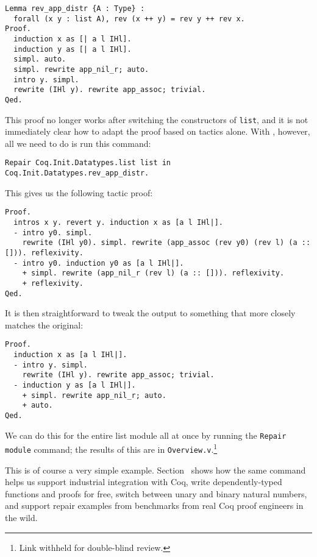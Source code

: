 \begin{lstlisting}
Lemma rev_app_distr {A : Type} :
  forall (x y : list A), rev (x ++ y) = rev y ++ rev x.
Proof.
  induction x as [| a l IHl].
  induction y as [| a l IHl].
  simpl. auto.
  simpl. rewrite app_nil_r; auto.
  intro y. simpl.
  rewrite (IHl y). rewrite app_assoc; trivial.
Qed.
\end{lstlisting}
This proof no longer works after switching the constructors of \lstinline{list},
and it is not immediately clear how to adapt the proof based on tactics alone.
With \toolname, however, all we need to do is run this command: %

\begin{lstlisting}
Repair Coq.Init.Datatypes.list list in Coq.Init.Datatypes.rev_app_distr.
\end{lstlisting}
This gives us the following tactic proof:

\begin{lstlisting}
Proof.
  intros x y. revert y. induction x as [a l IHl|].
  - intro y0. simpl.
    rewrite (IHl y0). simpl. rewrite (app_assoc (rev y0) (rev l) (a :: [])). reflexivity.
  - intro y0. induction y0 as [a l IHl|].
    + simpl. rewrite (app_nil_r (rev l) (a :: [])). reflexivity.
    + reflexivity.
Qed.
\end{lstlisting}
It is then straightforward to tweak the output to something
that more closely matches the original:

\begin{lstlisting}
Proof.
  induction x as [a l IHl|].
  - intro y. simpl.
    rewrite (IHl y). rewrite app_assoc; trivial.
  - induction y as [a l IHl|].
    + simpl. rewrite app_nil_r; auto.
    + auto.
Qed.
\end{lstlisting}

We can do this for the entire list module all at once by running the \lstinline{Repair module}
command; the results of this are in \lstinline{Overview.v}.\footnote{Link withheld for double-blind review.}

This is of course a very simple example. Section~\label{sec:case} shows how the same command
helps us support industrial integration with Coq, write dependently-typed functions and proofs for free,
switch between unary and binary natural numbers, and support repair examples from benchmarks
from real Coq proof engineers in the wild.




